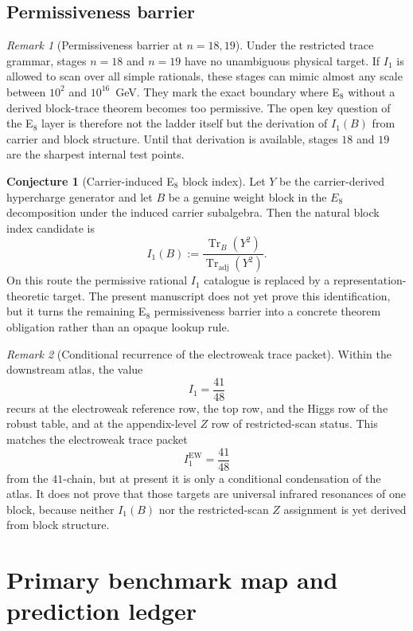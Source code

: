 \documentclass[11pt,a4paper]{article}
\theoremstyle{definition}
\newtheorem{conjecture}[theorem]{Conjecture}
\theoremstyle{remark}
\newtheorem*{remark}{Remark}
\begin{document}
\subsection{Permissiveness barrier}

\begin{remark}[Permissiveness barrier at $n=18{,}19$]
Under the restricted trace grammar, stages $n=18$ and $n=19$ have no unambiguous physical target. If $I_1$ is allowed to scan over all simple rationals, these stages can mimic almost any scale between $10^2$ and $10^{16}$~GeV. They mark the exact boundary where E$_8$ without a derived block-trace theorem becomes too permissive. The open key question of the E$_8$ layer is therefore not the ladder itself but the derivation of $I_1(B)$ from carrier and block structure. Until that derivation is available, stages $18$ and $19$ are the sharpest internal test points.
\end{remark}

\begin{conjecture}[Carrier-induced E$_8$ block index]
Let $Y$ be the carrier-derived hypercharge generator and let $B$ be a genuine weight block in the $E_8$ decomposition under the induced carrier subalgebra. Then the natural block index candidate is
\[
I_1(B):=\frac{\operatorname{Tr}_B(Y^2)}{\operatorname{Tr}_{\mathrm{adj}}(Y^2)}.
\]
On this route the permissive rational $I_1$ catalogue is replaced by a representation-theoretic target. The present manuscript does not yet prove this identification, but it turns the remaining E$_8$ permissiveness barrier into a concrete theorem obligation rather than an opaque lookup rule.
\end{conjecture}

\begin{remark}[Conditional recurrence of the electroweak trace packet]
Within the downstream atlas, the value
\[
I_1=\frac{41}{48}
\]
recurs at the electroweak reference row, the top row, and the Higgs row of the robust table, and at the appendix-level $Z$ row of restricted-scan status. This matches the electroweak trace packet
\[
I_1^{\mathrm{EW}}=\frac{41}{48}
\]
from the $41$-chain, but at present it is only a conditional condensation of the atlas. It does not prove that those targets are universal infrared resonances of one block, because neither $I_1(B)$ nor the restricted-scan $Z$ assignment is yet derived from block structure.
\end{remark}

\section{Primary benchmark map and prediction ledger}
\end{document}
